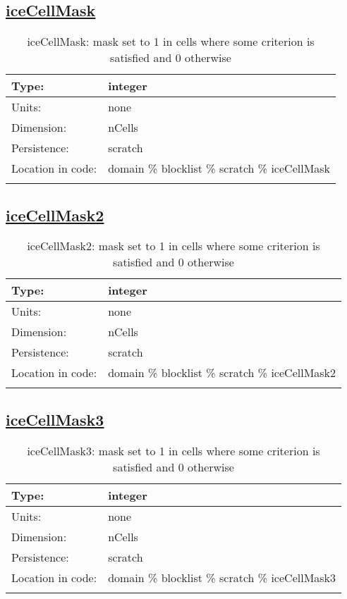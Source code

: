 \subsection[iceCellMask]{\hyperref[sec:var_tab_scratch]{iceCellMask}}
\label{subsec:var_sec_scratch_iceCellMask}
\begin{center}
\begin{longtable}{| p{2.0in} | p{4.0in} |}
        \hline 
        Type: & integer \\
        \hline 
        Units: & \si{none} \\
        \hline 
        Dimension: & nCells \\
        \hline 
        Persistence: & scratch \\
        \hline 
         Location in code: & domain \% blocklist \% scratch \% iceCellMask \\
         \hline 
    \caption{iceCellMask: mask set to 1 in cells where some criterion is satisfied and 0 otherwise}
\end{longtable}
\end{center}
\subsection[iceCellMask2]{\hyperref[sec:var_tab_scratch]{iceCellMask2}}
\label{subsec:var_sec_scratch_iceCellMask2}
\begin{center}
\begin{longtable}{| p{2.0in} | p{4.0in} |}
        \hline 
        Type: & integer \\
        \hline 
        Units: & \si{none} \\
        \hline 
        Dimension: & nCells \\
        \hline 
        Persistence: & scratch \\
        \hline 
         Location in code: & domain \% blocklist \% scratch \% iceCellMask2 \\
         \hline 
    \caption{iceCellMask2: mask set to 1 in cells where some criterion is satisfied and 0 otherwise}
\end{longtable}
\end{center}
\subsection[iceCellMask3]{\hyperref[sec:var_tab_scratch]{iceCellMask3}}
\label{subsec:var_sec_scratch_iceCellMask3}
\begin{center}
\begin{longtable}{| p{2.0in} | p{4.0in} |}
        \hline 
        Type: & integer \\
        \hline 
        Units: & \si{none} \\
        \hline 
        Dimension: & nCells \\
        \hline 
        Persistence: & scratch \\
        \hline 
         Location in code: & domain \% blocklist \% scratch \% iceCellMask3 \\
         \hline 
    \caption{iceCellMask3: mask set to 1 in cells where some criterion is satisfied and 0 otherwise}
\end{longtable}
\end{center}
